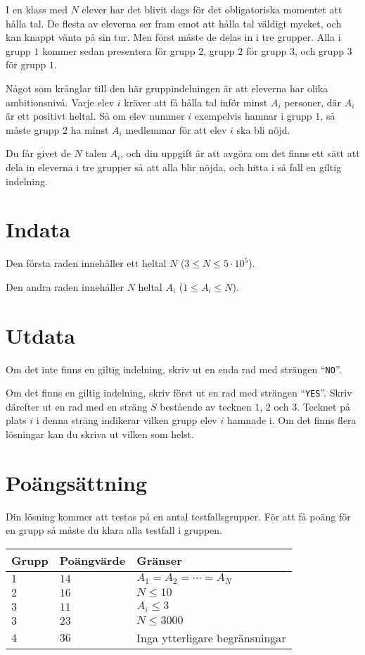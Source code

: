 I en klass med $N$ elever har det blivit dags för det obligatoriska momentet att hålla tal. 
De flesta av eleverna ser fram emot att hålla tal väldigt mycket, och kan knappt vänta på sin tur.
Men först måste de delas in i tre grupper. Alla i grupp $1$ kommer sedan presentera för grupp $2$, 
grupp $2$ för grupp $3$, och grupp $3$ för grupp $1$. 

Något som krånglar till den här gruppindelningen är att eleverna har olika ambitionsnivå. Varje elev $i$
kräver att få hålla tal inför minst $A_i$ personer, där $A_i$ är ett positivt heltal. Så om elev
nummer $i$ exempelvis hamnar i grupp $1$, så måste grupp $2$ ha minst $A_i$ medlemmar för att elev 
$i$ ska bli nöjd.

Du får givet de $N$ talen $A_i$, och din uppgift är att avgöra om det finns ett sätt att dela in eleverna
i tre grupper så att alla blir nöjda, och hitta i så fall en giltig indelning.


\section*{Indata}
Den första raden innehåller ett heltal $N$ ($3 \leq N \leq 5 \cdot 10^5$).

Den andra raden innehåller $N$ heltal $A_i$ ($1 \leq A_i \leq N$).

\section*{Utdata}

Om det inte finns en giltig indelning, skriv ut en enda rad med strängen ``\texttt{NO}''.

Om det finns en giltig indelning, skriv först ut en rad med strängen ``\texttt{YES}''. 
Skriv därefter ut en rad med en sträng $S$ bestående av tecknen $1$, $2$ och $3$. Tecknet på
plats $i$ i denna sträng indikerar vilken grupp elev $i$ hamnade i. Om det finns flera lösningar
kan du skriva ut vilken som helst.

\section*{Poängsättning}
Din lösning kommer att testas på en antal testfallsgrupper.
För att få poäng för en grupp så måste du klara alla testfall i gruppen.

\noindent
\begin{tabular}{| l | l | p{12cm} |}
  \hline
  Grupp & Poängvärde & Gränser \\ \hline
  $1$   & $14$       & $A_1 = A_2 = \cdots = A_N$\\ \hline
  $2$   & $16$       & $N \leq 10$  \\ \hline
  $3$   & $11$       & $A_i \leq 3$ \\ \hline
  $3$   & $23$       & $N \leq 3000$ \\ \hline
  $4$   & $36$       & Inga ytterligare begränsningar \\ \hline
\end{tabular}
